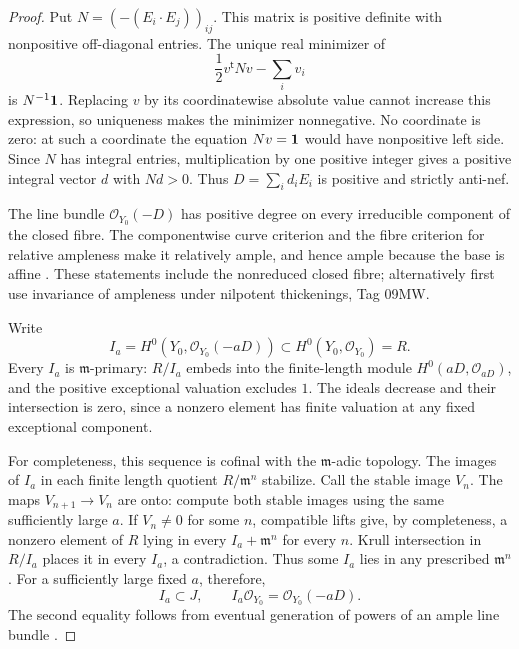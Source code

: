 \begin{proof}
Put $N=(-(E_i\cdot E_j))_{ij}$. This matrix is positive definite
with nonpositive off-diagonal entries. The unique real minimizer
of
\[
             \frac12v^{\mathsf t}Nv-\sum_i v_i
\]
is $N^{-1}{\bf1}$. Replacing $v$ by its coordinatewise absolute
value cannot increase this expression, so uniqueness makes
the minimizer nonnegative. No coordinate is zero: at such a
coordinate the equation $Nv={\bf1}$ would have nonpositive
left side. Since $N$ has integral entries, multiplication by
one positive integer gives a positive integral vector $d$
with $Nd>0$. Thus $D=\sum_i d_iE_i$ is positive and strictly
anti-nef.

The line bundle $\mathcal O_{Y_0}(-D)$ has positive degree on
every irreducible component of the closed fibre. The
componentwise curve criterion and the fibre criterion for
relative ampleness make it relatively ample, and hence ample
because the base is affine
\citep[Lemma~33.44.15, Tag 0B5Y, and Lemma~30.21.4,
Tag 0D2N]{StacksComparableCyclesB}. These statements include
the nonreduced closed fibre; alternatively first use invariance
of ampleness under nilpotent thickenings, Tag 09MW.

Write
\[
 I_a=H^0(Y_0,\mathcal O_{Y_0}(-aD))\subset
      H^0(Y_0,\mathcal O_{Y_0})=R.                         \tag{D.CR.3}
\]
Every $I_a$ is $\mathfrak m$-primary: $R/I_a$ embeds into the
finite-length module $H^0(aD,\mathcal O_{aD})$, and the
positive exceptional valuation excludes $1$. The ideals
decrease and their intersection is zero, since a nonzero
element has finite valuation at any fixed exceptional
component.

For completeness, this sequence is cofinal with the
$\mathfrak m$-adic topology. The images of $I_a$ in each finite
length quotient $R/\mathfrak m^n$ stabilize. Call the stable
image $V_n$. The maps $V_{n+1}\to V_n$ are onto: compute
both stable images using the same sufficiently large $a$.
If $V_n\ne0$ for some $n$, compatible lifts give, by completeness,
a nonzero element of $R$ lying in every
$I_a+\mathfrak m^n$ for every $n$. Krull intersection in
$R/I_a$ places it in every $I_a$, a contradiction. Thus some
$I_a$ lies in any prescribed $\mathfrak m^n$. For a sufficiently
large fixed $a$, therefore,
\[
        I_a\subset J,\qquad
        I_a\mathcal O_{Y_0}=\mathcal O_{Y_0}(-aD).
                                                               \tag{D.CR.4}
\]
The second equality follows from eventual generation of
powers of an ample line bundle
\citep[Proposition~28.27.13, condition~(7) and its full proof,
Tag 01PR]{StacksComparableCyclesB}.


\end{proof}

